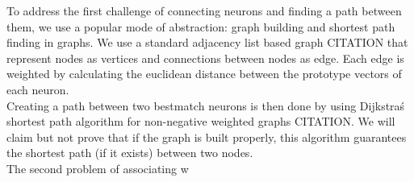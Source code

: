 To address the first challenge of connecting neurons and finding a path between them, we use a popular mode of abstraction: graph building and shortest path finding in graphs. We use a standard adjacency list based graph CITATION that represent nodes as vertices and connections between nodes as edge. Each edge is weighted by calculating the euclidean distance between the prototype vectors of each neuron. \\
Creating a path between two bestmatch neurons is then done by using Dijkstra\'s shortest path algorithm for non-negative weighted graphs CITATION. We will claim but not prove that if the graph is built properly, this algorithm guarantees the shortest path (if it exists) between two nodes. \\

The second problem of associating w  




